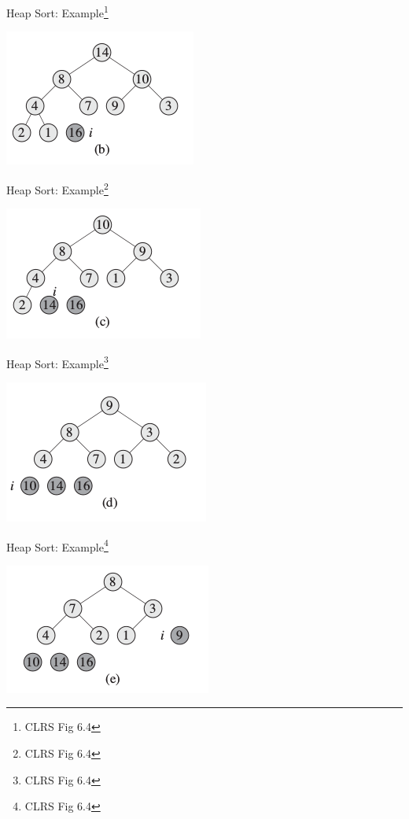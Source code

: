 \documentclass{beamer}
\begin{document}
\begin{frame}{Heap Sort: Example\footnote{CLRS Fig 6.4}}
    \begin{center}
        \includegraphics[scale=0.7]{heapSort2.png}
    \end{center}
\end{frame}


\begin{frame}{Heap Sort: Example\footnote{CLRS Fig 6.4}}
    \begin{center}
        \includegraphics[scale=0.7]{heapSort3.png}
    \end{center}
\end{frame}


\begin{frame}{Heap Sort: Example\footnote{CLRS Fig 6.4}}
    \begin{center}
        \includegraphics[scale=0.7]{heapSort4.png}
    \end{center}
\end{frame}


\begin{frame}{Heap Sort: Example\footnote{CLRS Fig 6.4}}
    \begin{center}
        \includegraphics[scale=0.7]{heapSort5.png}
    \end{center}
\end{frame}
\end{document}
